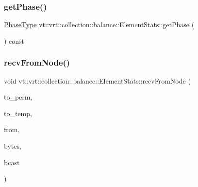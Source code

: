 \mbox{\label{structvt_1_1vrt_1_1collection_1_1balance_1_1_element_stats_a24fcc0af9fb6017b556828a52431bc1c}} 
\subsubsection{\texorpdfstring{get\+Phase()}{getPhase()}}
{\footnotesize\ttfamily \hyperlink{structvt_1_1vrt_1_1collection_1_1balance_1_1_element_stats_a6edee983bb2ae96a341763520af33c66}{Phase\+Type} vt\+::vrt\+::collection\+::balance\+::\+Element\+Stats\+::get\+Phase (\begin{DoxyParamCaption}{ }\end{DoxyParamCaption}) const}

\mbox{\label{structvt_1_1vrt_1_1collection_1_1balance_1_1_element_stats_af251d52d4d0be99a7745295148abcb4e}} 
\subsubsection{\texorpdfstring{recv\+From\+Node()}{recvFromNode()}}
{\footnotesize\ttfamily void vt\+::vrt\+::collection\+::balance\+::\+Element\+Stats\+::recv\+From\+Node (\begin{DoxyParamCaption}\item[{\hyperlink{namespacevt_1_1vrt_1_1collection_1_1balance_a14c8d2c972f2913aa3f1636e5be0a120}{Element\+I\+D\+Type}}]{to\+\_\+perm,  }\item[{\hyperlink{namespacevt_1_1vrt_1_1collection_1_1balance_a14c8d2c972f2913aa3f1636e5be0a120}{Element\+I\+D\+Type}}]{to\+\_\+temp,  }\item[{\hyperlink{namespacevt_a866da9d0efc19c0a1ce79e9e492f47e2}{Node\+Type}}]{from,  }\item[{double}]{bytes,  }\item[{bool}]{bcast }\end{DoxyParamCaption})}

